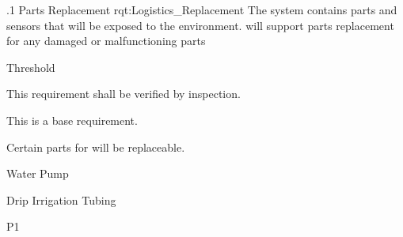 \ONERQMTV
{\RqtNumberBase.1}
{Parts Replacement}
{rqt:Logistics_Replacement}
{The system contains parts and sensors that will be exposed to the environment. \ThisSystem will support parts replacement for any damaged or malfunctioning parts}
{
	\item [All Phases] Threshold
}
{This requirement shall be verified by inspection.}
{
	\item [N/A] This is a base requirement.
}
{
	\item Certain parts for \ThisSys will be replaceable.
	\item Water Pump
	\item Drip Irrigation Tubing
}
{P1}


